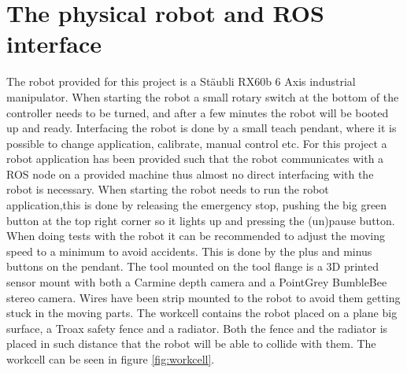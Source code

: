 

\section{The physical robot and ROS interface}
\label{sec:robot_physical}
The robot provided for this project is a Stäubli RX60b 6 Axis industrial manipulator. When starting the robot a small rotary switch at the bottom of the controller needs to be turned, and after a few minutes the robot will be booted up and ready. Interfacing the robot is done by a small teach pendant, where it is possible to change application, calibrate, manual control etc. For this project a robot application has been provided such that the robot communicates with a ROS node on a provided machine thus almost no direct interfacing with the robot is necessary. When starting the robot needs to run the robot application,this is done by releasing the emergency stop, pushing the big green button at the top right corner so it lights up and pressing the (un)pause button. When doing tests with the robot it can be recommended to adjust the moving speed to a minimum to avoid accidents. This is done by the plus and minus buttons on the pendant.
The tool mounted on the tool flange is a 3D printed sensor mount with both a Carmine depth camera and a PointGrey BumbleBee stereo camera. Wires have been strip mounted to the robot to avoid them getting stuck in the moving parts. 
The workcell contains the robot placed on a plane big surface, a Troax safety fence and a radiator. Both the fence and the radiator is placed in such distance that the robot will be able to collide with them. The workcell can be seen in figure \ref{fig:workcell}.

